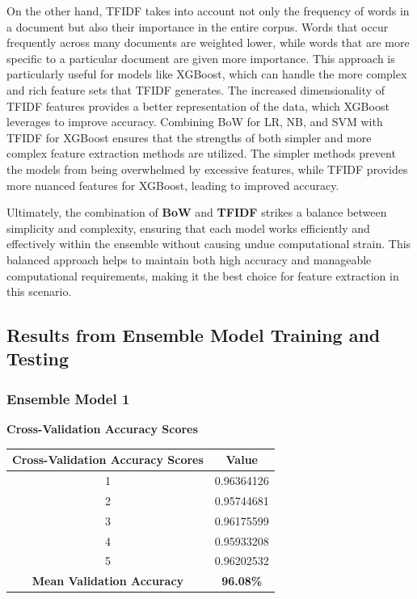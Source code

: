 \noindent
On the other hand, TFIDF takes into account not only the frequency of words in a document but also their importance in the entire corpus. Words that occur frequently across many documents are weighted lower, while words that are more specific to a particular document are given more importance. This approach is particularly useful for models like XGBoost, which can handle the more complex and rich feature sets that TFIDF generates. The increased dimensionality of TFIDF features provides a better representation of the data, which XGBoost leverages to improve accuracy. Combining BoW for LR, NB, and SVM with TFIDF for XGBoost ensures that the strengths of both simpler and more complex feature extraction methods are utilized. The simpler methods prevent the models from being overwhelmed by excessive features, while TFIDF provides more nuanced features for XGBoost, leading to improved accuracy.

\vspace{1em}

\noindent
Ultimately, the combination of \textbf{BoW} and \textbf{TFIDF} strikes a balance between simplicity and complexity, ensuring that each model works efficiently and effectively within the ensemble without causing undue computational strain. This balanced approach helps to maintain both high accuracy and manageable computational requirements, making it the best choice for feature extraction in this scenario.


\subsection{Results from Ensemble Model Training and Testing}
\subsubsection{Ensemble Model 1}

\begin{center}
    \textbf{Cross-Validation Accuracy Scores} \\[0.5em]
    \begin{tabular}{|c|c|}
        \hline
        \textbf{Cross-Validation Accuracy Scores} & \textbf{Value} \\ \hline
        1 & 0.96364126 \\ \hline
        2 & 0.95744681 \\ \hline
        3 & 0.96175599 \\ \hline
        4 & 0.95933208 \\ \hline
        5 & 0.96202532 \\ \hline
        \textbf{Mean Validation Accuracy} & \textbf{96.08\%} \\ \hline
    \end{tabular}
\end{center}


